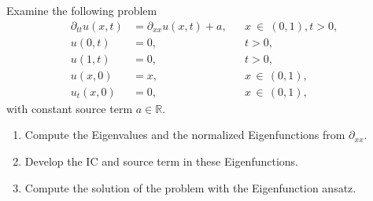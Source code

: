 \documentclass[12pt]{article}
\begin{document}

\newpage
\begin{example}
	Examine the following problem
	\begin{align*}
		\partial_{tt} u(x,t) & =   \partial_{xx}u(x,t) + a, &  & x\ \in\ (0,1), t>0, \\
		u(0,t)               & =0,                          &  & t>0,                \\
		u(1,t)               & =0,                          &  & t>0,                \\
		u(x,0)               & = x,                         &  & x\, \in\, (0,1),    \\
		u_t(x,0)             & = 0,                         &  & x\, \in\, (0,1),
	\end{align*}
	with constant source term $a\in\mathbb{R}$.
	\begin{enumerate}
		\item Compute the Eigenvalues and the normalized Eigenfunctions from $\partial_{xx}$.
		\item Develop the IC and source term in these Eigenfunctions.
		\item Compute the solution of the problem with the Eigenfunction ansatz.
	\end{enumerate}
\end{example}
\end{document}
